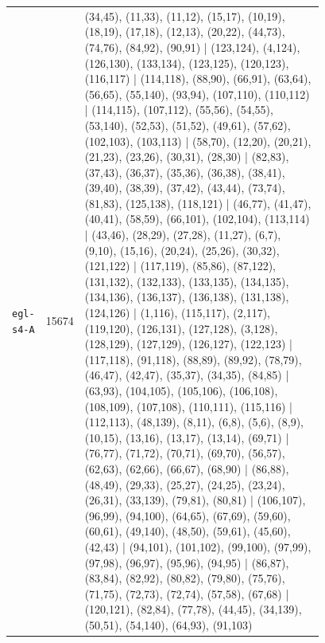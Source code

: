\begin{landscape}
\begin{longtable}{lr>{\tiny\raggedright\arraybackslash}p{0.78\linewidth}}
\texttt{egl-s4-A} & 15674 & (34,45), (11,33), (11,12), (15,17), (10,19), (18,19), (17,18), (12,13), (20,22), (44,73), (74,76), (84,92), (90,91) | (123,124), (4,124), (126,130), (133,134), (123,125), (120,123), (116,117) | (114,118), (88,90), (66,91), (63,64), (56,65), (55,140), (93,94), (107,110), (110,112) | (114,115), (107,112), (55,56), (54,55), (53,140), (52,53), (51,52), (49,61), (57,62), (102,103), (103,113) | (58,70), (12,20), (20,21), (21,23), (23,26), (30,31), (28,30) | (82,83), (37,43), (36,37), (35,36), (36,38), (38,41), (39,40), (38,39), (37,42), (43,44), (73,74), (81,83), (125,138), (118,121) | (46,77), (41,47), (40,41), (58,59), (66,101), (102,104), (113,114) | (43,46), (28,29), (27,28), (11,27), (6,7), (9,10), (15,16), (20,24), (25,26), (30,32), (121,122) | (117,119), (85,86), (87,122), (131,132), (132,133), (133,135), (134,135), (134,136), (136,137), (136,138), (131,138), (124,126) | (1,116), (115,117), (2,117), (119,120), (126,131), (127,128), (3,128), (128,129), (127,129), (126,127), (122,123) | (117,118), (91,118), (88,89), (89,92), (78,79), (46,47), (42,47), (35,37), (34,35), (84,85) | (63,93), (104,105), (105,106), (106,108), (108,109), (107,108), (110,111), (115,116) | (112,113), (48,139), (8,11), (6,8), (5,6), (8,9), (10,15), (13,16), (13,17), (13,14), (69,71) | (76,77), (71,72), (70,71), (69,70), (56,57), (62,63), (62,66), (66,67), (68,90) | (86,88), (48,49), (29,33), (25,27), (24,25), (23,24), (26,31), (33,139), (79,81), (80,81) | (106,107), (96,99), (94,100), (64,65), (67,69), (59,60), (60,61), (49,140), (48,50), (59,61), (45,60), (42,43) | (94,101), (101,102), (99,100), (97,99), (97,98), (96,97), (95,96), (94,95) | (86,87), (83,84), (82,92), (80,82), (79,80), (75,76), (71,75), (72,73), (72,74), (57,58), (67,68) | (120,121), (82,84), (77,78), (44,45), (34,139), (50,51), (54,140), (64,93), (91,103) \\[2pt]

\end{longtable}
\end{landscape}
